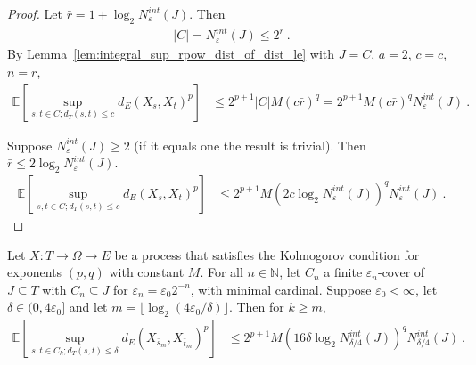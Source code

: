 \begin{proof}\leanok
Let $\bar{r} = 1 + \log_2 N^{int}_{\varepsilon}(J)$. Then
\begin{align*}
  \vert C \vert
  = N^{int}_{\varepsilon}(J)
  \le 2^{\bar{r}}
  \: .
\end{align*}
By Lemma~\ref{lem:integral_sup_rpow_dist_of_dist_le} with $J = C$, $a = 2$, $c = c$, $n = \bar{r}$,
\begin{align*}
  \mathbb{E} \left[ \sup_{s, t \in C; d_T(s, t) \le c} d_E(X_s, X_t)^p \right]
  &\le 2^{p+1} |C| M (c \bar{r})^q
  = 2^{p+1} M (c \bar{r})^q N^{int}_{\varepsilon}(J)
  \: .
\end{align*}

Suppose $N^{int}_{\varepsilon}(J) \ge 2$ (if it equals one the result is trivial).
Then $\bar{r} \le 2 \log_2 N^{int}_{\varepsilon}(J)$.
\begin{align*}
  \mathbb{E} \left[ \sup_{s, t \in C; d_T(s, t) \le c} d_E(X_s, X_t)^p \right]
  &\le 2^{p+1} M \left(2 c \log_2 N^{int}_{\varepsilon}(J) \right)^q  N^{int}_{\varepsilon}(J)
  \: .
\end{align*}
\end{proof}

\begin{lemma}\label{lem:integral_sup_rpow_dist_cover_rescale}
  \leanok
Let $X : T \to \Omega \to E$ be a process that satisfies the Kolmogorov condition for exponents $(p,q)$ with constant $M$.
For all $n \in \mathbb{N}$, let $C_n$ a finite $\varepsilon_n$-cover of $J \subseteq T$ with $C_n \subseteq J$ for $\varepsilon_n = \varepsilon_0 2^{-n}$, with minimal cardinal.
Suppose $\varepsilon_0 < \infty$, let $\delta \in (0, 4 \varepsilon_0]$ and let $m = \lfloor \log_2(4\varepsilon_0/\delta) \rfloor$.
Then for $k \ge m$,
\begin{align*}
  \mathbb{E} \left[ \sup_{s, t \in C_k; d_T(s, t) \le \delta} d_E(X_{\bar{s}_m}, X_{\bar{t}_m})^p \right]
  &\le 2^{p+1} M \left(16 \delta \log_2 N^{int}_{\delta/4}(J) \right)^q  N^{int}_{\delta/4}(J)
  \: .
\end{align*}
\end{lemma}

